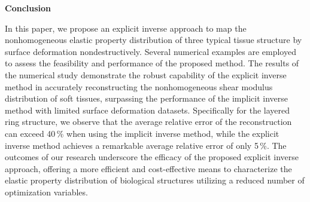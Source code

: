 \documentclass[11pt]{article}
\begin{document}
\vspace{0.5em}

\noindent\textbf{Conclusion}

\vspace{0.3em}

\noindent
In this paper, we propose an explicit inverse approach to map
the nonhomogeneous elastic property distribution of three
typical tissue structure by surface deformation nondestructively.
Several numerical examples are employed to assess the
feasibility and performance of the proposed method. The results
of the numerical study demonstrate the robust capability of the
explicit inverse method in accurately reconstructing the
nonhomogeneous shear modulus distribution of soft tissues,
surpassing the performance of the implicit inverse method with
limited surface deformation datasets. Specifically for the
layered ring structure, we observe that the average relative
error of the reconstruction can exceed 40\,\% when using the
implicit inverse method, while the explicit inverse method
achieves a remarkable average relative error of only 5\,\%.
The outcomes of our research underscore the efficacy of the
proposed explicit inverse approach, offering a more efficient
and cost-effective means to characterize the elastic property
distribution of biological structures utilizing a reduced
number of optimization variables.


\newpage

\end{document}
